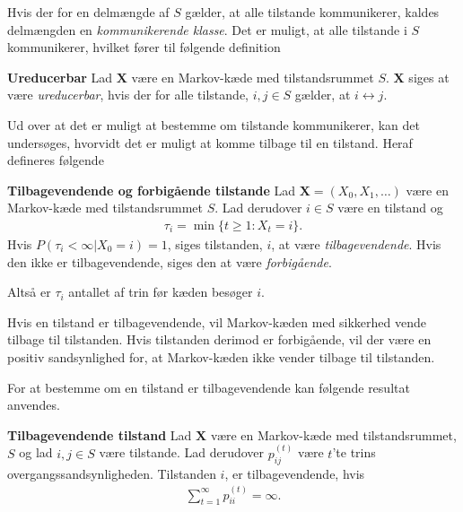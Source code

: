 Hvis der for en delmængde af $S$ gælder, at alle tilstande kommunikerer, kaldes delmængden en \textit{kommunikerende klasse}. Det er muligt, at alle tilstande i $S$ kommunikerer, hvilket fører til følgende definition 

\begin{minipage}\textwidth
\begin{defn}\label{def:ureducerbar} \textbf{Ureducerbar} %
\newline
Lad $\bm X$ være en Markov-kæde med tilstandsrummet $S$. $\bm X$ siges at være \textit{ureducerbar}, hvis der for alle tilstande, $i,j \in S$ gælder, at $i \leftrightarrow j$.
\end{defn}
\end{minipage}

Ud over at det er muligt at bestemme om tilstande kommunikerer, kan det undersøges, hvorvidt det er muligt at komme tilbage til en tilstand. Heraf defineres følgende



\begin{minipage}\textwidth
\begin{defn}\textbf{Tilbagevendende og forbigående tilstande} \label{def:tau}%
\newline
Lad $\bm X = (X_0, X_1, \dots)$ være en Markov-kæde med tilstandsrummet $S$. Lad derudover $i\in S$ være en tilstand og
\begin{align*}
    \tau_i=\min\{t\geq1:X_t=i\}.
\end{align*}
Hvis $P(\tau_i<\infty|X_0=i)=1$, siges tilstanden, $i$, at være \textit{tilbagevendende}. Hvis den ikke er tilbagevendende, siges den at være \textit{forbigående}.
\end{defn}
\end{minipage}

Altså er $\tau_i$ antallet af trin før kæden besøger $i$.

Hvis en tilstand er tilbagevendende, vil Markov-kæden med sikkerhed vende tilbage til tilstanden. Hvis tilstanden derimod er forbigående, vil der være en positiv sandsynlighed for, at Markov-kæden ikke vender tilbage til tilstanden. 

For at bestemme om en tilstand er tilbagevendende kan  følgende resultat anvendes.

\begin{minipage}\textwidth
\begin{thmx}\label{tilbagevendende} \textbf{Tilbagevendende tilstand} %
\newline
Lad $\bm X$ være en Markov-kæde med tilstandsrummet, $S$ og lad $i,j \in S$ være tilstande. Lad derudover $p_{ij}^{(t)}$ være $t$'te trins overgangssandsynligheden. Tilstanden $i$, er tilbagevendende, hvis
\begin{align*}
 \sum_{t=1}^\infty p_{ii}^{(t)}=\infty.
\end{align*}
\end{thmx}
\end{minipage}

